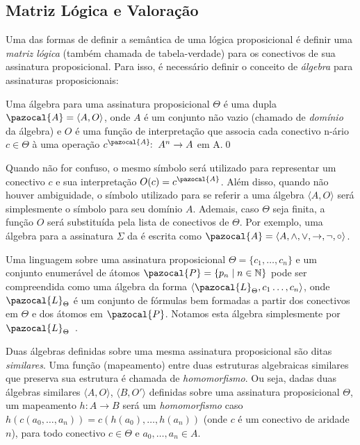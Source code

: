     \subsection{Matriz Lógica e Valoração}
        Uma das formas de definir a semântica de uma lógica proposicional é definir uma \textit{matriz lógica} (também chamada de tabela-verdade) para os conectivos de sua assinatura proposicional. Para isso, é necessário definir o conceito de \textit{álgebra} para assinaturas proposicionais:
        \begin{definicao}
        \label{def:algebra}
            Uma álgebra para uma assinatura proposicional $\Theta$ é uma dupla $\pazocal{A} = \langle A, O \rangle$, onde $A$ é um conjunto não vazio (chamado de \textit{domínio} da álgebra) e $O$ é uma função de interpretação que associa cada conectivo n-ário $c \in \Theta$ à uma operação $c^{\pazocal{A}}\!\! : \; A^{n} \rightarrow A$ em A.\qed{}
        \end{definicao}

        Quando não for confuso, o mesmo símbolo será utilizado para representar um conectivo $c$ e sua interpretação $O(c) = c^{\pazocal{A}}$. Além disso, quando não houver ambiguidade, o símbolo utilizado para se referir a uma álgebra $\langle A, O \rangle$ será simplesmente o símbolo para seu domínio $A$. Ademais, caso $\Theta$ seja finita, a função $O$ será substituída pela lista de conectivos de $\Theta$. Por exemplo, uma álgebra para a assinatura $\Sigma$ da \lfium{} é escrita como $\pazocal{A} = \langle A,\land, \lor, \rightarrow, \neg, \circ \rangle$.

        \begin{observacao}
            Uma linguagem sobre uma assinatura proposicional $\Theta = \{c_{1}, \ldots, c_{n}\}$ e um conjunto enumerável de átomos $\pazocal{P} = \{p_{n} \; | \; n \in \mathbb{N} \}$ pode ser compreendida como uma álgebra da forma $\langle \pazocal{L}_{\Theta}, c_{1}\ldots, c_{n} \rangle$, onde $\pazocal{L}_{\Theta}$ é um conjunto de fórmulas bem formadas a partir dos conectivos em $\Theta$ e dos átomos em $\pazocal{P}$. Notamos esta álgebra simplesmente por $\pazocal{L}_{\Theta}$~\cite{Sikorski1966-SIKAOF,Wojcicki1984-WJCLOP}.
        \end{observacao}

        Duas álgebras definidas sobre uma mesma assinatura proposicional são ditas \textit{similares}. Uma função (mapeamento) entre duas estruturas algebraicas similares que preserva sua estrutura é chamada de \textit{homomorfismo}. Ou seja, dadas duas álgebras similares $\langle A, O \rangle$, $\langle B, O' \rangle$ definidas sobre uma assinatura proposicional $\Theta$, um mapeamento $h : A \rightarrow B$ será um \textit{homomorfismo} caso $h(c(a_{0},\ldots, a_{n})) = c(h(a_{0}),\ldots, h(a_{n}))$ (onde $c$ é um conectivo de aridade $n$), para todo conectivo $c \in \Theta$ e $a_{0},\ldots,a_{n} \in A$. 

